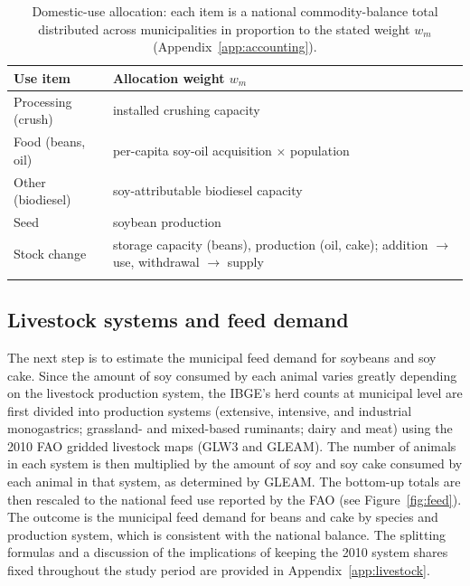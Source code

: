 \documentclass[pdflatex,sn-nature]{sn-jnl}%
\begin{document}
\begin{table}[htbp]
\small
\caption{Domestic-use allocation: each item is a national commodity-balance
total distributed across municipalities in proportion to the stated weight
$w_m$ (Appendix~\ref{app:accounting}).}\label{tab:weights}
\begin{tabularx}{\textwidth}{@{}lX@{}}
\toprule
Use item & Allocation weight $w_m$ \\
\midrule
Processing (crush)  & installed crushing capacity \\
Food (beans, oil)   & per-capita soy-oil acquisition $\times$ population \\
Other (biodiesel)   & soy-attributable biodiesel capacity \\
Seed                & soybean production \\
Stock change        & storage capacity (beans), production (oil, cake); addition $\to$ use, withdrawal $\to$ supply \\
\botrule
\end{tabularx}
\end{table}

\subsection{Livestock systems and feed demand}\label{subsec:feed}
The next step is to estimate the municipal feed demand for soybeans and soy
cake. Since the amount of soy consumed by each animal varies greatly
depending on the livestock production system, the IBGE's herd counts at
municipal level are first divided into production systems (extensive,
intensive, and industrial monogastrics; grassland- and mixed-based
ruminants; dairy and meat) using the 2010 FAO gridded livestock maps (GLW3
and GLEAM). The number of animals in each system is then multiplied by the
amount of soy and soy cake consumed by each animal in that system, as
determined by GLEAM. The bottom-up totals are then rescaled to the national
feed use reported by the FAO (see Figure~\ref{fig:feed}). The outcome is
the municipal feed demand for beans and cake by species and production
system, which is consistent with the national balance. The splitting
formulas and a discussion of the implications of keeping the 2010 system shares fixed
throughout the study period are provided in
Appendix~\ref{app:livestock}.
\end{document}
